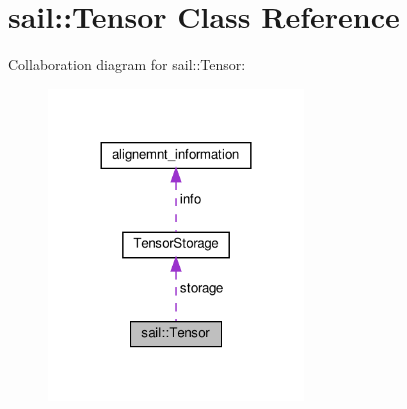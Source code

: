 \hypertarget{classsail_1_1Tensor}{}\section{sail\+:\+:Tensor Class Reference}
\label{classsail_1_1Tensor}


Collaboration diagram for sail\+:\+:Tensor\+:\nopagebreak
\begin{figure}[H]
\begin{center}
\leavevmode
\includegraphics[width=192pt]{classsail_1_1Tensor__coll__graph}
\end{center}
\end{figure}
